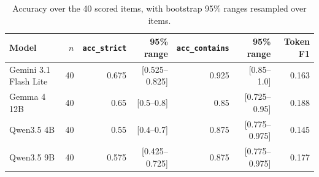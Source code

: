 \begin{table}[htbp]
\centering
\caption{Accuracy over the 40 scored items, with bootstrap 95\% ranges resampled over items.}
\label{tab:accuracy}
{\small
\begin{tabular}{@{}lrrrrrr@{}}
\toprule
Model & $n$ & \texttt{acc\_strict} & 95\% range & \texttt{acc\_contains} & 95\% range & Token F1 \\
\midrule
Gemini 3.1 Flash Lite & 40 & 0.675 & [0.525--0.825] & 0.925 & [0.85--1.0] & 0.163 \\
Gemma 4 12B & 40 & 0.65 & [0.5--0.8] & 0.85 & [0.725--0.95] & 0.188 \\
Qwen3.5 4B & 40 & 0.55 & [0.4--0.7] & 0.875 & [0.775--0.975] & 0.145 \\
Qwen3.5 9B & 40 & 0.575 & [0.425--0.725] & 0.875 & [0.775--0.975] & 0.177 \\
\bottomrule
\end{tabular}}
\end{table}
